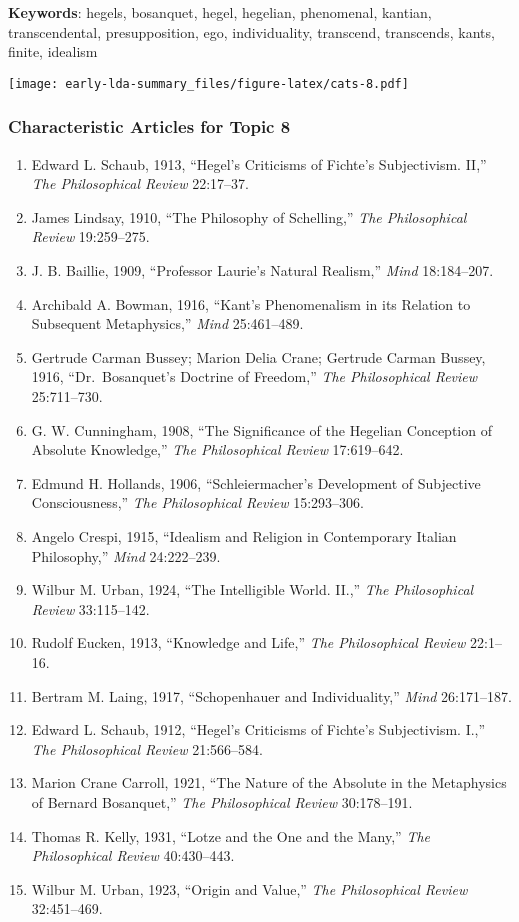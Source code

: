\documentclass[
]{article}
\begin{document}
\textbf{Keywords}: hegels, bosanquet, hegel, hegelian, phenomenal,
kantian, transcendental, presupposition, ego, individuality, transcend,
transcends, kants, finite, idealism

\texttt{[image: early-lda-summary\_files/figure-latex/cats-8.pdf]}
\newpage 

\hypertarget{characteristic-articles-for-topic-8}{%
\subsubsection{Characteristic Articles for Topic
8}\label{characteristic-articles-for-topic-8}}

\begin{enumerate}
\def\labelenumi{\arabic{enumi}.}
\item
  Edward L. Schaub, 1913, ``Hegel's Criticisms of Fichte's Subjectivism.
  II,'' \emph{The Philosophical Review} 22:17--37.
\item
  James Lindsay, 1910, ``The Philosophy of Schelling,'' \emph{The
  Philosophical Review} 19:259--275.
\item
  J. B. Baillie, 1909, ``Professor Laurie's Natural Realism,''
  \emph{Mind} 18:184--207.
\item
  Archibald A. Bowman, 1916, ``Kant's Phenomenalism in its Relation to
  Subsequent Metaphysics,'' \emph{Mind} 25:461--489.
\item
  Gertrude Carman Bussey; Marion Delia Crane; Gertrude Carman Bussey,
  1916, ``Dr.~Bosanquet's Doctrine of Freedom,'' \emph{The Philosophical
  Review} 25:711--730.
\item
  G. W. Cunningham, 1908, ``The Significance of the Hegelian Conception
  of Absolute Knowledge,'' \emph{The Philosophical Review} 17:619--642.
\item
  Edmund H. Hollands, 1906, ``Schleiermacher's Development of Subjective
  Consciousness,'' \emph{The Philosophical Review} 15:293--306.
\item
  Angelo Crespi, 1915, ``Idealism and Religion in Contemporary Italian
  Philosophy,'' \emph{Mind} 24:222--239.
\item
  Wilbur M. Urban, 1924, ``The Intelligible World. II.,'' \emph{The
  Philosophical Review} 33:115--142.
\item
  Rudolf Eucken, 1913, ``Knowledge and Life,'' \emph{The Philosophical
  Review} 22:1--16.
\item
  Bertram M. Laing, 1917, ``Schopenhauer and Individuality,''
  \emph{Mind} 26:171--187.
\item
  Edward L. Schaub, 1912, ``Hegel's Criticisms of Fichte's Subjectivism.
  I.,'' \emph{The Philosophical Review} 21:566--584.
\item
  Marion Crane Carroll, 1921, ``The Nature of the Absolute in the
  Metaphysics of Bernard Bosanquet,'' \emph{The Philosophical Review}
  30:178--191.
\item
  Thomas R. Kelly, 1931, ``Lotze and the One and the Many,'' \emph{The
  Philosophical Review} 40:430--443.
\item
  Wilbur M. Urban, 1923, ``Origin and Value,'' \emph{The Philosophical
  Review} 32:451--469.
\end{enumerate}
\end{document}
